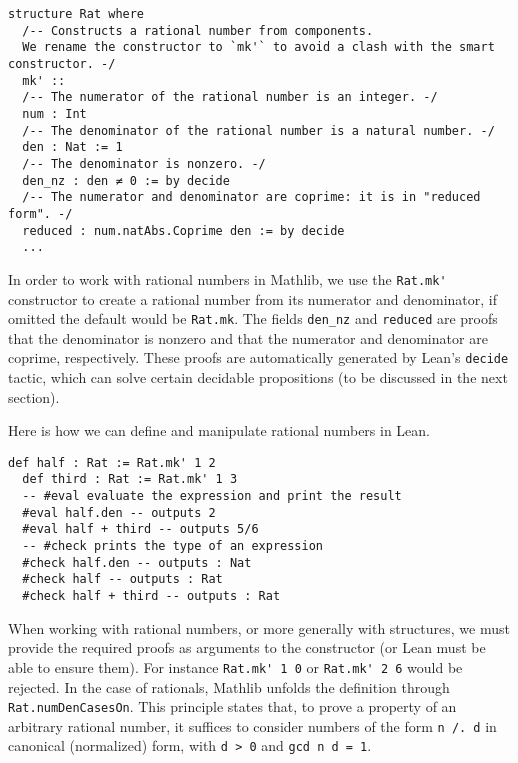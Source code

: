 \begin{lstlisting}[language=lean]
  structure Rat where
  /-- Constructs a rational number from components.
  We rename the constructor to `mk'` to avoid a clash with the smart constructor. -/
  mk' ::
  /-- The numerator of the rational number is an integer. -/
  num : Int
  /-- The denominator of the rational number is a natural number. -/
  den : Nat := 1
  /-- The denominator is nonzero. -/
  den_nz : den ≠ 0 := by decide
  /-- The numerator and denominator are coprime: it is in "reduced form". -/
  reduced : num.natAbs.Coprime den := by decide
  ...
\end{lstlisting}
In order to work with rational numbers in Mathlib, we use the
\lstinline[language=lean]|Rat.mk'| constructor to create a rational number from
its numerator and denominator, if omitted the default would be \lstinline[language=lean]|Rat.mk|.
The fields \lstinline[language=lean]|den_nz| and \lstinline[language=lean]|reduced| are proofs that 
the denominator is nonzero and that the numerator and denominator are coprime, respectively. 
These proofs are automatically generated by Lean's \lstinline[language=lean]|decide| tactic, which can 
solve certain decidable propositions (to be discussed in the next section).
\begin{example} 
  Here is how we can define and manipulate rational numbers in Lean.
  \begin{lstlisting}[language=lean]
  def half : Rat := Rat.mk' 1 2
  def third : Rat := Rat.mk' 1 3
  -- #eval evaluate the expression and print the result
  #eval half.den -- outputs 2
  #eval half + third -- outputs 5/6
  -- #check prints the type of an expression
  #check half.den -- outputs : Nat
  #check half -- outputs : Rat
  #check half + third -- outputs : Rat
  \end{lstlisting}
\end{example}
When working with rational numbers, or more generally with structures, we must provide the 
required proofs as arguments to the constructor (or Lean must be able to ensure them).
For instance \lstinline[language=lean]|Rat.mk' 1 0| or \lstinline[language=lean]|Rat.mk' 2 6| would be rejected.
In the case of rationals, Mathlib unfolds the definition through
\lstinline[language=lean]|Rat.numDenCasesOn|. This principle states that, to prove a property of an 
arbitrary rational number, it suffices to consider numbers of the form \lstinline[language=lean]|n /. d| 
in canonical (normalized) form, with \lstinline[language=lean]|d > 0| and \lstinline[language=lean]|gcd n d = 1|.
